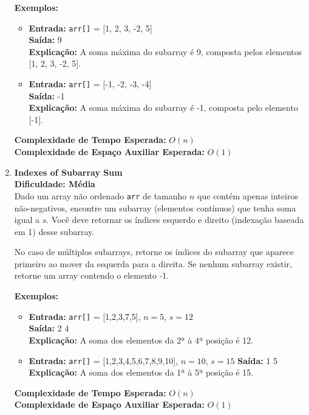 \documentclass[a4paper,12pt]{article}
\begin{document}
\begin{enumerate}
    \textbf{Exemplos:}
    \begin{itemize}
        \item \textbf{Entrada:} \texttt{arr[]} = [1, 2, 3, -2, 5] \\
        \textbf{Saída:} 9 \\
        \textbf{Explicação:} A soma máxima do subarray é 9, composta pelos elementos [1, 2, 3, -2, 5].
        
        \item \textbf{Entrada:} \texttt{arr[]} = [-1, -2, -3, -4] \\
        \textbf{Saída:} -1 \\
        \textbf{Explicação:} A soma máxima do subarray é -1, composta pelo elemento [-1].
    \end{itemize}
    
    \textbf{Complexidade de Tempo Esperada:} \( O(n) \) \\
    \textbf{Complexidade de Espaço Auxiliar Esperada:} \( O(1) \)

    \item \textbf{Indexes of Subarray Sum} \\
    \textbf{Dificuldade: Média} \\
    Dado um array não ordenado \texttt{arr} de tamanho \( n \) que contém apenas inteiros não-negativos, encontre um subarray (elementos contínuos) que tenha soma igual a \( s \). Você deve retornar os índices esquerdo e direito (indexação baseada em 1) desse subarray.

    No caso de múltiplos subarrays, retorne os índices do subarray que aparece primeiro ao mover da esquerda para a direita. Se nenhum subarray existir, retorne um array contendo o elemento -1.

    \textbf{Exemplos:}
    \begin{itemize}
        \item \textbf{Entrada:} \texttt{arr[]} = [1,2,3,7,5], \( n = 5 \), \( s = 12 \) \\
        \textbf{Saída:} 2 4 \\
        \textbf{Explicação:} A soma dos elementos da 2ª à 4ª posição é 12.
        
        \item \textbf{Entrada:} \texttt{arr[]} = [1,2,3,4,5,6,7,8,9,10], \( n = 10 \), \( s = 15 \)
        \textbf{Saída:} 1 5 \\
        \textbf{Explicação:} A soma dos elementos da 1ª à 5ª posição é 15.
    \end{itemize}
    
    \textbf{Complexidade de Tempo Esperada:} \( O(n) \) \\
    \textbf{Complexidade de Espaço Auxiliar Esperada:} \( O(1) \)

\end{enumerate}
\end{document}
